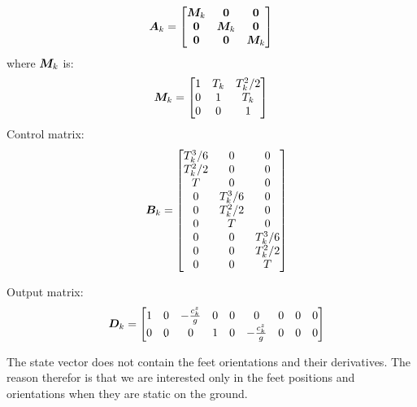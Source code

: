 \documentclass[a4paper]{article}
\begin{document}
\begin{equation}
\M{A}_k = 
\begin{bmatrix}
    \M{M}_k       & \M{0}         & \M{0} \\
    \M{0}         & \M{M}_k       & \M{0} \\
    \M{0}         & \M{0}         & \M{M}_k \\
\end{bmatrix}
\end{equation}
\noindent where $\M{M}_k$ is:
\begin{equation}
\M{M}_k =
\begin{bmatrix}
    1       & T_k   & T_k^2/2\\   
    0       & 1     & T_k    \\   
    0       & 0     & 1      \\   
\end{bmatrix}
\end{equation}
\noindent Control matrix:
\begin{equation}
\quad
\M{B}_k =
\begin{bmatrix}
    T_k^3/6 & 0       & 0       \\
    T_k^2/2 & 0       & 0       \\
    T       & 0       & 0       \\
    0       & T_k^3/6 & 0       \\
    0       & T_k^2/2 & 0       \\
    0       & T       & 0       \\
    0       & 0       & T_k^3/6 \\ 
    0       & 0       & T_k^2/2 \\
    0       & 0       & T       
\end{bmatrix}
\end{equation}

\noindent Output matrix:
\begin{equation}
\quad
\M{D}_k =
\begin{bmatrix}
    1 & 0 & -\frac{c_{k}^{z}}{g} & 0 & 0 & 0 & 0 & 0 & 0\\
    0 & 0 & 0 & 1 & 0 & -\frac{c_{k}^{z}}{g} & 0 & 0 & 0\\
\end{bmatrix}
\end{equation}

\noindent The state vector does not contain the feet orientations and their derivatives. The reason therefor is that we are interested only in the feet positions and orientations when they are static on the ground.
\end{document}

